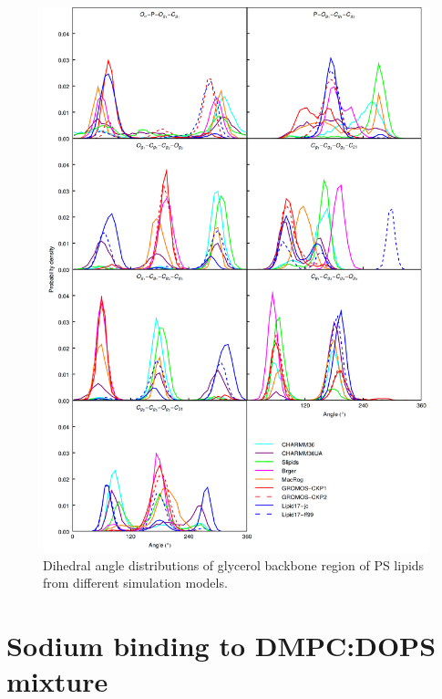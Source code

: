 \documentclass[journal=jpcbfk]{achemso}
\begin{document}
\begin{figure}[]
  \centering
  \includegraphics[width=15.0cm]{../Figs/figS6.png}
  \caption{\label{dihedralsGLY}
    Dihedral angle distributions of glycerol backbone region of PS lipids from different simulation models.
  }
\end{figure}


\pagebreak

\section{Sodium binding to DMPC:DOPS mixture}
\end{document}
